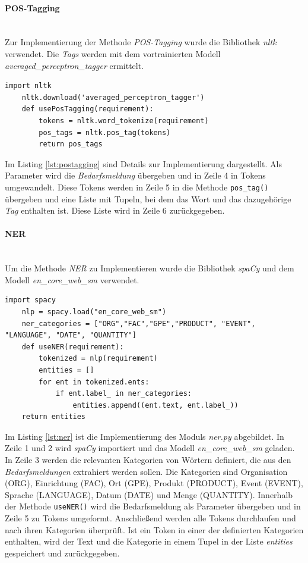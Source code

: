\paragraph{POS-Tagging}\mbox{}\\
Zur Implementierung der Methode \emph{POS-Tagging} wurde die Bibliothek \emph{nltk} verwendet. Die \emph{Tags} werden mit dem vortrainierten Modell \emph{averaged\_perceptron\_tagger} ermittelt.
\begin{lstlisting}[caption={Implementation des Moduls \emph{posTagging.py}}, label=lst:postagging]
	import nltk
	nltk.download('averaged_perceptron_tagger')
	def usePosTagging(requirement):
		tokens = nltk.word_tokenize(requirement)
		pos_tags = nltk.pos_tag(tokens)
		return pos_tags
\end{lstlisting}
Im Listing \ref{lst:postagging} sind Details zur Implementierung dargestellt. Als Parameter wird die \emph{Bedarfsmeldung} übergeben und in Zeile 4 in Tokens umgewandelt. Diese Tokens werden in Zeile 5 in die Methode \lstinline{pos_tag()}
übergeben und eine Liste mit Tupeln, bei dem das Wort und das dazugehörige \emph{Tag} enthalten ist. Diese Liste wird in Zeile 6 zurückgegeben.
\paragraph{NER}\mbox{}\\
Um die Methode \emph{NER} zu Implementieren wurde die Bibliothek \emph{spaCy} und dem Modell \emph{en\_core\_web\_sm} verwendet. 
\begin{lstlisting}[caption={Implementation des Moduls \emph{ner.py}}, label=lst:ner]
	import spacy
	nlp = spacy.load("en_core_web_sm")
	ner_categories = ["ORG","FAC","GPE","PRODUCT", "EVENT", "LANGUAGE", "DATE", "QUANTITY"]
	def useNER(requirement):
		tokenized = nlp(requirement)
		entities = []
		for ent in tokenized.ents:
			if ent.label_ in ner_categories:
				entities.append((ent.text, ent.label_))
	return entities
\end{lstlisting}
Im Listing \ref{lst:ner} ist die Implementierung des Moduls \emph{ner.py} abgebildet. In Zeile 1 und 2 wird \emph{spaCy} importiert und das Modell \emph{en\_core\_web\_sm} geladen. In Zeile 3 werden die relevanten Kategorien von Wörtern definiert, die aus den \emph{Bedarfsmeldungen} extrahiert werden sollen. Die Kategorien sind Organisation (ORG), Einrichtung (FAC), Ort (GPE), Produkt (PRODUCT), Event (EVENT), Sprache (LANGUAGE), Datum (DATE) und Menge (QUANTITY). Innerhalb der Methode \lstinline{useNER()} wird die Bedarfsmeldung als Parameter übergeben und in Zeile 5 zu Tokens umgeformt. Anschließend werden alle Tokens durchlaufen und nach ihren Kategorien überprüft. Ist ein Token in einer der definierten Kategorien enthalten, wird der Text und die Kategorie in einem Tupel in der Liste \emph{entities} gespeichert und zurückgegeben.
